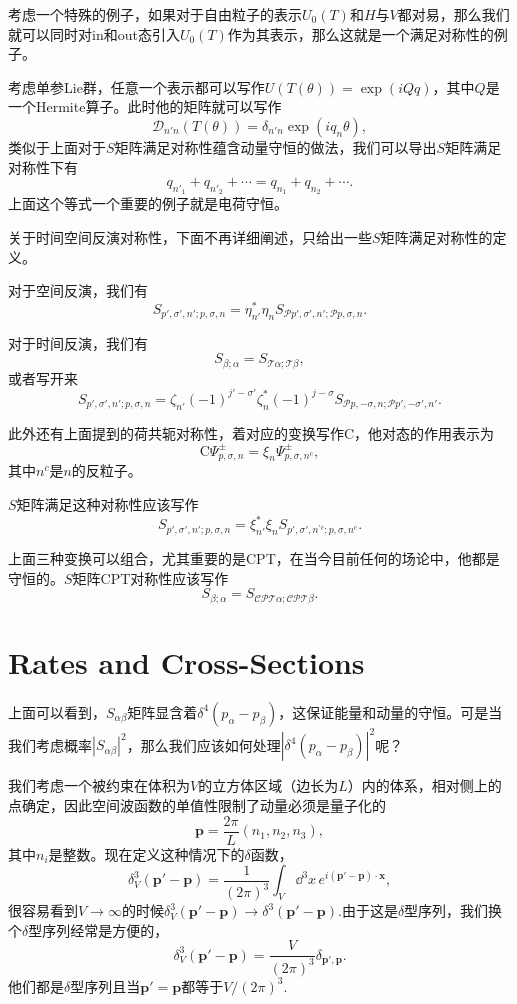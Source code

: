 考虑一个特殊的例子，如果对于自由粒子的表示$U_0(T)$和$H$与$V$都对易，那么我们就可以同时对in和out态引入$U_0(T)$作为其表示，那么这就是一个满足对称性的例子。

考虑单参Lie群，任意一个表示都可以写作$U(T(\theta))=\exp(iQq)$，其中$Q$是一个Hermite算子。此时他的矩阵就可以写作
\[
	\mathcal{D}_{n'n}(T(\theta))=\delta_{n'n}\exp(iq_n\theta),
\]
类似于上面对于$S$矩阵满足对称性蕴含动量守恒的做法，我们可以导出$S$矩阵满足对称性下有
\[
	q_{n'_1}+q_{n'_2}+\cdots=q_{n_1}+q_{n_2}+\cdots.
\]
上面这个等式一个重要的例子就是电荷守恒。

关于时间空间反演对称性，下面不再详细阐述，只给出一些$S$矩阵满足对称性的定义。

对于空间反演，我们有
\[
	S_{p',\sigma',n';p,\sigma,n}=\eta^*_{n'}\eta_{n}S_{\mathscr{P}p',\sigma',n';\mathscr{P}p,\sigma,n}.
\]

对于时间反演，我们有
\[
	S_{\beta;\alpha}=S_{\mathscr{T}\alpha;\mathscr{T}\beta},
\]
或者写开来
\[
	S_{p',\sigma',n';p,\sigma,n}=\zeta_{n'}(-1)^{j'-\sigma'}\zeta^*_{n}(-1)^{j-\sigma}S_{\mathscr{P}p,-\sigma,n;\mathscr{P}p',-\sigma',n'}.
\]

此外还有上面提到的荷共轭对称性，着对应的变换写作$\mathrm{C}$，他对态的作用表示为
\[
	\mathrm{C}\Psi^{\pm}_{p,\sigma,n}=\xi_n\Psi^{\pm}_{p,\sigma,n^c},
\]
其中$n^c$是$n$的反粒子。

$S$矩阵满足这种对称性应该写作
\[
	S_{p',\sigma',n';p,\sigma,n}=\xi^*_{n'}\xi_nS_{p',\sigma',n^{\prime c};p,\sigma,n^c}.
\]

上面三种变换可以组合，尤其重要的是CPT，在当今目前任何的场论中，他都是守恒的。$S$矩阵CPT对称性应该写作
\[
	S_{\beta;\alpha}=S_{\mathscr{CPT}\alpha;\mathscr{CPT}\beta}.
\]
\section{Rates and Cross-Sections}
上面可以看到，$S_{\alpha\beta}$矩阵显含着$\delta^4(p_\alpha-p_\beta)$，这保证能量和动量的守恒。可是当我们考虑概率$|S_{\alpha\beta}|^2$，那么我们应该如何处理$|\delta^4(p_\alpha-p_\beta)|^2$呢？


我们考虑一个被约束在体积为$V$的立方体区域（边长为$L
$）内的体系，相对侧上的点确定，因此空间波函数的单值性限制了动量必须是量子化的
\[
	\bm{p}=\frac{2\pi}{L}(n_1,n_2,n_3),
\]
其中$n_i$是整数。现在定义这种情况下的$\delta$函数，
\[
	\delta^3_V(\bm{p}'-\bm{p})=\frac{1}{(2\pi)^3}\int_V \dd^3 x \,e^{i(\bm{p}'-\bm{p})\cdot \bm{x}},
\]
很容易看到$V\to \infty$的时候$\delta^3_V(\bm{p}'-\bm{p})\to \delta^3(\bm{p}'-\bm{p})$.由于这是$\delta$型序列，我们换个$\delta$型序列经常是方便的，
\[
	\delta^3_V(\bm{p}'-\bm{p})=\frac{V}{(2\pi)^3}\delta_{\bm{p}',\bm{p}}.
\]
他们都是$\delta$型序列且当$\bm{p}'=\bm{p}$都等于$V/(2\pi)^3$.

